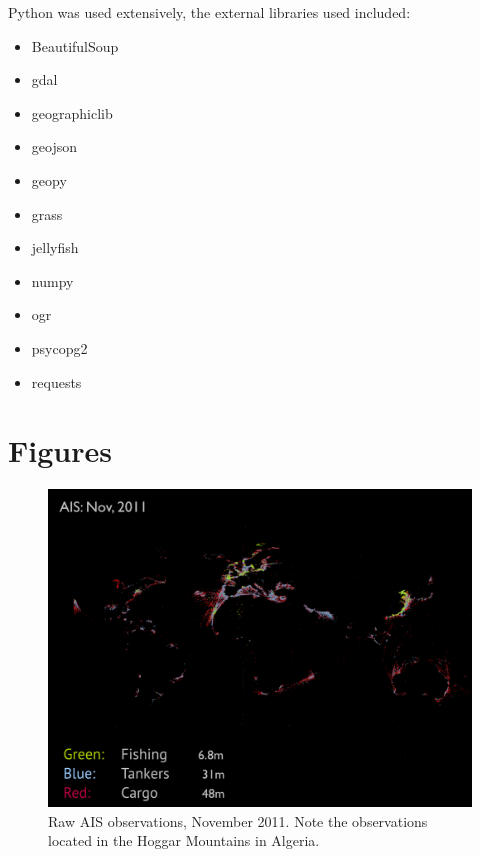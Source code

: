 Python was used extensively, the external libraries used included:
\begin{itemize}
  \item BeautifulSoup
  \item gdal
  \item geographiclib
  \item geojson
  \item geopy
  \item grass
  \item jellyfish
  \item numpy
  \item ogr
  \item psycopg2
  \item requests
\end{itemize}

\chapter{Figures}
\label{sec:figures}

\begin{figure}[htbp]
  \centering
  \includegraphics[width=160mm]{figures/ais-nov-2011.pdf}
  \caption[AIS observations, November 2011]{Raw AIS observations, November 2011. Note the observations located in the Hoggar Mountains in Algeria.}
  \label{fig:ais-obs-nov-2011}
\end{figure}

